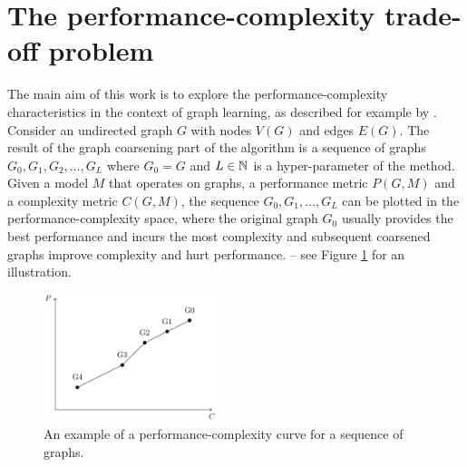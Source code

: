 \section{The performance-complexity trade-off problem}\label{sec:performance-complexity}

The main aim of this work is to explore the performance-complexity characteristics in the context of graph learning, as described for example by \cite{prochazka_downstream_2022}. Consider an undirected graph \( G \) with nodes \( V \left( G \right) \) and edges \( E \left( G \right) \). The result of the graph coarsening part of the algorithm is a sequence of graphs \( G_0, G_1, G_2, \dots, G_L \) where \( G_0 = G \) and \( L \in \mathbb{N} \) is a hyper-parameter of the method.
Given a model \( M \) that operates on graphs, a performance metric \( P \left( G, M \right) \) and a complexity metric \( C \left( G, M \right) \), the sequence \( G_0, G_1, \dots, G_L \) can be plotted in the performance-complexity space, where the original graph \( G_0 \) usually provides the best performance and incurs the most complexity and subsequent coarsened graphs improve complexity and hurt performance. -- see Figure \ref{fig:performance-complexity} for an illustration.

\begin{figure}
  \centering
  \includegraphics[width=0.45\textwidth]{images/performance-complexity/performance-complexity.pdf}
  \caption{An example of a performance-complexity curve for a sequence of graphs.}
  \label{fig:performance-complexity}
\end{figure}

